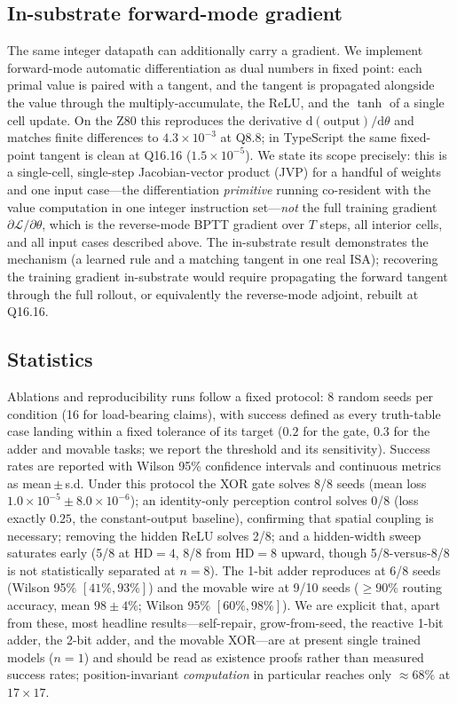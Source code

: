 \subsection*{In-substrate forward-mode gradient}

The same integer datapath can additionally carry a gradient. We implement forward-mode automatic differentiation \citep{wengert1964ad,griewank2008evaluating} as dual numbers in fixed point: each primal value is paired with a tangent, and the tangent is propagated alongside the value through the multiply-accumulate, the ReLU, and the $\tanh$ of a single cell update. On the Z80 this reproduces the derivative $\mathrm{d}(\text{output})/\mathrm{d}\theta$ and matches finite differences to $4.3\times10^{-3}$ at Q8.8; in TypeScript the same fixed-point tangent is clean at Q16.16 ($1.5\times10^{-5}$). We state its scope precisely: this is a single-cell, single-step Jacobian-vector product (JVP) for a handful of weights and one input case---the differentiation \emph{primitive} running co-resident with the value computation in one integer instruction set---\emph{not} the full training gradient $\partial\mathcal{L}/\partial\theta$, which is the reverse-mode BPTT gradient over $T$ steps, all interior cells, and all input cases described above. The in-substrate result demonstrates the mechanism (a learned rule and a matching tangent in one real ISA); recovering the training gradient in-substrate would require propagating the forward tangent through the full rollout, or equivalently the reverse-mode adjoint, rebuilt at Q16.16.

\subsection*{Statistics}

Ablations and reproducibility runs follow a fixed protocol: 8 random seeds per condition (16 for load-bearing claims), with success defined as every truth-table case landing within a fixed tolerance of its target ($0.2$ for the gate, $0.3$ for the adder and movable tasks; we report the threshold and its sensitivity). Success rates are reported with Wilson 95\% confidence intervals and continuous metrics as mean\,$\pm$\,s.d. Under this protocol the XOR gate solves 8/8 seeds (mean loss $1.0\times10^{-5}\pm8.0\times10^{-6}$); an identity-only perception control solves 0/8 (loss exactly $0.25$, the constant-output baseline), confirming that spatial coupling is necessary; removing the hidden ReLU solves 2/8; and a hidden-width sweep saturates early (5/8 at $\mathrm{HD}=4$, 8/8 from $\mathrm{HD}=8$ upward, though 5/8-versus-8/8 is not statistically separated at $n=8$). The 1-bit adder reproduces at 6/8 seeds (Wilson 95\% $[41\%, 93\%]$) and the movable wire at 9/10 seeds ($\geq90\%$ routing accuracy, mean $98\pm4\%$; Wilson 95\% $[60\%, 98\%]$). We are explicit that, apart from these, most headline results---self-repair, grow-from-seed, the reactive 1-bit adder, the 2-bit adder, and the movable XOR---are at present single trained models ($n=1$) and should be read as existence proofs rather than measured success rates; position-invariant \emph{computation} in particular reaches only $\approx68\%$ at $17\times17$.
